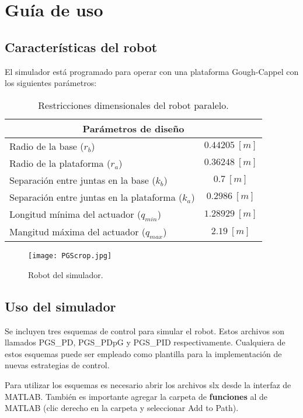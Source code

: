 \chapter{Guía de uso}

\section{Características del robot}
El simulador está programado para operar con una 
plataforma Gough-Cappel con los siguientes parámetros:

\begin{table}[htb!]
\centering
\begin{tabular}{lc}

\multicolumn{2}{c}{Parámetros de diseño} \\ \hline
Radio de la base ($r_b$) & $0.44205 \ [m]$ \\ 
Radio de la plataforma ($r_a$) & $0.36248 \ [m]$ \\ 
Separación entre juntas en la base ($k_b$) & $0.7 \ [m]$ \\ 
Separación entre juntas en la plataforma ($k_a$) & $0.2986 \ [m]$ \\ 
Longitud mínima del actuador ($q_{min}$) & $1.28929 \ [m]$ \\ 
Mangitud máxima del actuador ($q_{max}$) &  $2.19 \ [m]$ \\ 
\end{tabular}
\caption{Restricciones dimensionales del robot paralelo.}
\label{tab: restricciones}
\end{table}

\begin{figure}[htb!]
\centering
 \texttt{[image: PGScrop.jpg]}
 \caption{Robot del simulador.}
\end{figure}


\section{Uso del simulador}
Se incluyen tres esquemas de control para simular el robot.
Estos archivos son llamados PGS\_PD, PGS\_PDpG y PGS\_PID respectivamente.
Cualquiera de estos esquemas puede ser empleado como plantilla
para la implementación de nuevas estrategias de control.

Para utilizar los esquemas es necesario abrir los archivos slx 
desde la interfaz de MATLAB.
También es importante agregar la carpeta de \textbf{funciones}
al  de MATLAB 
(clic derecho en la carpeta y seleccionar Add to Path).

